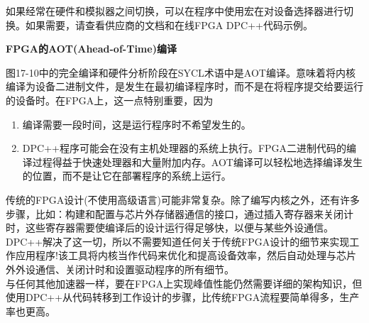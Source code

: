 如果经常在硬件和模拟器之间切换，可以在程序中使用宏在对设备选择器进行切换。如果需要，请查看供应商的文档和在线FPGA DPC++代码示例。\par

\hspace*{\fill} \par %
\textbf{FPGA的AOT(Ahead-of-Time)编译}

图17-10中的完全编译和硬件分析阶段在SYCL术语中是AOT编译。意味着将内核编译为设备二进制文件，是发生在最初编译程序时，而不是在将程序提交给要运行的设备时。在FPGA上，这一点特别重要，因为\par

\begin{enumerate}
	\item 编译需要一段时间，这是运行程序时不希望发生的。
	\item DPC++程序可能会在没有主机处理器的系统上执行。FPGA二进制代码的编译过程得益于快速处理器和大量附加内存。AOT编译可以轻松地选择编译发生的位置，而不是让它在部署程序的系统上运行。
\end{enumerate}

\begin{tcolorbox}[colback=blue!5!white,colframe=blue!75!black, title=在FPGA上使用DPC++其实要经历很多!]
传统的FPGA设计(不使用高级语言)可能非常复杂。除了编写内核之外，还有许多步骤，比如：构建和配置与芯片外存储器通信的接口，通过插入寄存器来关闭计时，这些寄存器需要使编译后的设计运行得足够快，以便与某些外设通信。DPC++解决了这一切，所以不需要知道任何关于传统FPGA设计的细节来实现工作应用程序!该工具将内核当作代码来优化和提高设备效率，然后自动处理与芯片外外设通信、关闭计时和设置驱动程序的所有细节。\\

与任何其他加速器一样，要在FPGA上实现峰值性能仍然需要详细的架构知识，但使用DPC++从代码转移到工作设计的步骤，比传统FPGA流程要简单得多，生产率也更高。
\end{tcolorbox}



















